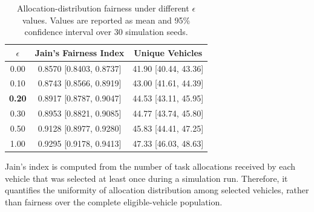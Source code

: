 \begin{table}[t]
\centering
\caption{Allocation-distribution fairness under different $\epsilon$ values. Values are reported as mean and 95\% confidence interval over 30 simulation seeds.}
\label{tab:jain_fairness_epsilon}
\begin{tabular}{c|cc}
\hline
$\epsilon$ & Jain's Fairness Index & Unique Vehicles \\
\hline
0.00 & 0.8570 [0.8403, 0.8737] & 41.90 [40.44, 43.36] \\
0.10 & 0.8743 [0.8566, 0.8919] & 43.00 [41.61, 44.39] \\
\textbf{0.20} & 0.8917 [0.8787, 0.9047] & 44.53 [43.11, 45.95] \\
0.30 & 0.8953 [0.8821, 0.9085] & 44.77 [43.74, 45.80] \\
0.50 & 0.9128 [0.8977, 0.9280] & 45.83 [44.41, 47.25] \\
1.00 & 0.9295 [0.9178, 0.9413] & 47.33 [46.03, 48.63] \\
\hline
\end{tabular}
\vspace{1mm}
\parbox{0.96\columnwidth}{\footnotesize Jain's index is computed from the number of task allocations received by each vehicle that was selected at least once during a simulation run. Therefore, it quantifies the uniformity of allocation distribution among selected vehicles, rather than fairness over the complete eligible-vehicle population.}
\end{table}